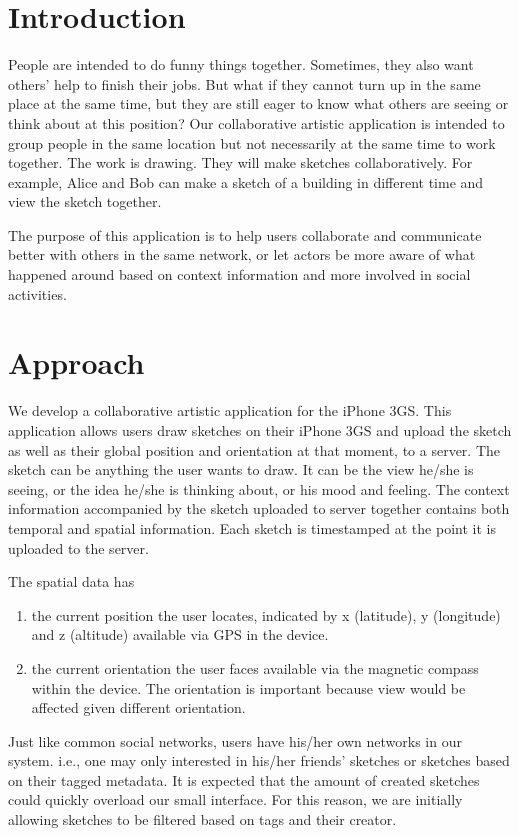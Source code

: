 \documentclass{chi2009}
\begin{document}
\section{Introduction}
People are intended to do funny things together. Sometimes, they also want others' help to finish their jobs. But what if they cannot turn up in the same place at the same time, but they are still eager to know what others are seeing or think about at this position? Our collaborative artistic application is intended to group people in the same location but not necessarily at the same time to work together. The work is drawing. They will make sketches collaboratively. For example, Alice and Bob can make a sketch of a building in different time and view the sketch together.

The purpose of this application is to help users collaborate and communicate better with others in the same network, or let actors be more aware of what happened around based on context information and more involved in social activities. 

\section{Approach}
We develop a collaborative artistic application for the iPhone 3GS. This application allows users draw sketches on their iPhone 3GS and upload the sketch as well as their global position and orientation at that moment, to a server. The sketch can be anything the user wants to draw. It can be the view he/she is seeing, or the idea he/she is thinking about, or his mood and feeling. The context information accompanied by the sketch uploaded to server together contains both temporal and spatial information. Each sketch is timestamped at the point it is uploaded to the server.

The spatial data has
\begin{enumerate}
\item the current position the user locates, indicated by x (latitude), y
	(longitude) and z (altitude) available via GPS in the device.
\item the current orientation the user faces available via the magnetic compass
	within the device.  The orientation is important because view would be affected given different
         orientation.
\end{enumerate}


Just like common social networks, users have his/her own networks in our
system. i.e., one may only interested in his/her friends' sketches or sketches
based on their tagged metadata.  It is expected that the amount of created
sketches could quickly overload our small interface.  For this reason, we are
initially allowing sketches to be filtered based on tags and their creator.
\end{document}
